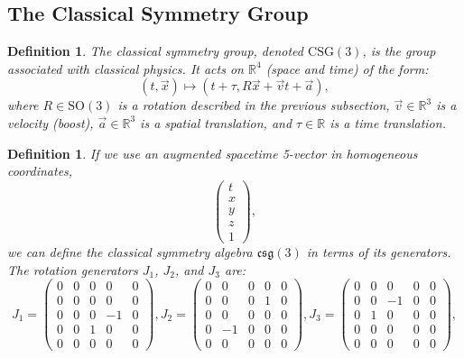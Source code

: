 \documentclass{amsart}
\newtheorem{definition}[theorem]{Definition}
\theoremstyle{remark}
\begin{document}
\subsection{The Classical Symmetry Group}
\begin{definition}
  The \emph{classical symmetry group}, denoted $\mathrm{CSG}(3)$, is the group associated with classical physics. It acts on $\mathbb{R}^4$ (space and time) of the form:
  \[
  (t, \vec{x}) \mapsto (t + \tau, R \vec{x} + \vec{v} t + \vec{a}),
  \]
  where $R \in \mathrm{SO}(3)$ is a rotation described in the previous subsection, $\vec{v} \in \mathbb{R}^3$ is a velocity (boost), $\vec{a} \in \mathbb{R}^3$ is a spatial translation, and $\tau \in \mathbb{R}$ is a time translation.
\end{definition}
\begin{definition}
  If we use an augmented spacetime 5-vector in homogeneous coordinates,
  \[
  \begin{pmatrix}
    t \\
    x \\
    y \\
    z \\
    1
  \end{pmatrix},
  \]
  we can define the classical symmetry algebra $\mathfrak{csg}(3)$ in terms of its generators. The rotation generators $J_1$, $J_2$, and $J_3$ are:
  \[
  J_1 =
  \begin{pmatrix}
    0 & 0 & 0 & 0 & 0 \\
    0 & 0 & 0 & 0 & 0 \\
    0 & 0 & 0 & -1 & 0 \\
    0 & 0 & 1 & 0 & 0 \\
    0 & 0 & 0 & 0 & 0
  \end{pmatrix},
  J_2 =
  \begin{pmatrix}
    0 & 0 & 0 & 0 & 0 \\
    0 & 0 & 0 & 1 & 0 \\
    0 & 0 & 0 & 0 & 0 \\
    0 & -1 & 0 & 0 & 0 \\
    0 & 0 & 0 & 0 & 0
  \end{pmatrix},
  J_3 =
  \begin{pmatrix}
    0 & 0 & 0 & 0 & 0 \\
    0 & 0 & -1 & 0 & 0 \\
    0 & 1 & 0 & 0 & 0 \\
    0 & 0 & 0 & 0 & 0 \\
    0 & 0 & 0 & 0 & 0
  \end{pmatrix},
\]
\end{definition}
\end{document}
